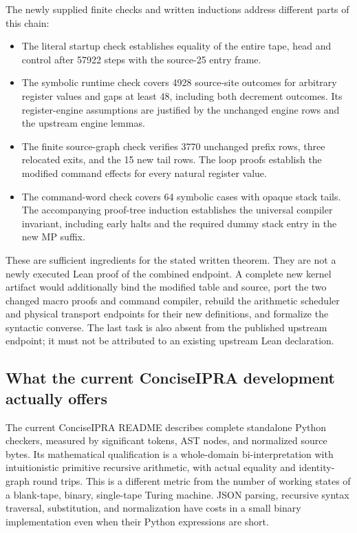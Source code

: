 The newly supplied finite checks and written inductions address different
parts of this chain:
\begin{itemize}
\item The literal startup check establishes equality of the entire tape,
head and control after 57922 steps with the source-25 entry frame.
\item The symbolic runtime check covers 4928 source-site outcomes for
arbitrary register values and gaps at least 48, including both decrement
outcomes.  Its register-engine assumptions are justified by the unchanged
engine rows and the upstream engine lemmas.
\item The finite source-graph check verifies 3770 unchanged prefix rows,
three relocated exits, and the 15 new tail rows.  The loop proofs establish
the modified command effects for every natural register value.
\item The command-word check covers 64 symbolic cases with opaque stack
tails.  The accompanying proof-tree induction establishes the universal
compiler invariant, including early halts and the required dummy stack
entry in the new MP suffix.
\end{itemize}

These are sufficient ingredients for the stated written theorem.  They
are not a newly executed Lean proof of the combined endpoint.  A complete
new kernel artifact would additionally bind the modified table and source,
port the two changed macro proofs and command compiler, rebuild the
arithmetic scheduler and physical transport endpoints for their new
definitions, and formalize the syntactic converse.  The last task is also
absent from the published upstream endpoint; it must not be attributed to
an existing upstream Lean declaration.

\subsection{What the current ConciseIPRA development actually offers}

The current ConciseIPRA README describes complete standalone Python
checkers, measured by significant tokens, AST nodes, and normalized source
bytes.  Its mathematical qualification is a whole-domain
bi-interpretation with intuitionistic primitive recursive arithmetic,
with actual equality and identity-graph round trips.  This is a different
metric from the number of working states of a blank-tape, binary,
single-tape Turing machine.  JSON parsing, recursive syntax traversal,
substitution, and normalization have costs in a small binary implementation
even when their Python expressions are short.

